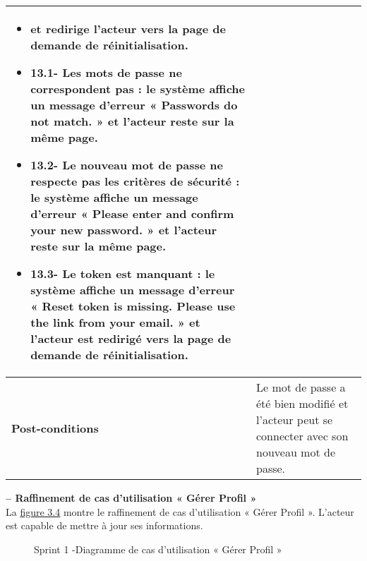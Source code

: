 \begin{longtable}{|>{\arraybackslash}p{4.2cm}|>{\arraybackslash}p{12.5cm}|}
\begin{itemize}[label=]
    \item et redirige l'acteur vers la page de demande de réinitialisation.
    \item{13.1-} Les mots de passe ne correspondent pas : le système affiche un message d'erreur « Passwords do not match. » et l'acteur reste sur la même page.
      \item{13.2-} Le nouveau mot de passe ne respecte pas les critères de sécurité : le système affiche un message d'erreur « Please enter and confirm your new password. » et l'acteur reste sur la même page.
      \item{13.3-} Le token est manquant : le système affiche un message d'erreur « Reset token is missing. Please use the link from your email. » et l'acteur est redirigé vers la page de demande de réinitialisation.

\end{itemize} \\
\hline
\textbf{Post-conditions } & Le mot de passe a été bien modifié et l'acteur peut se connecter avec son nouveau mot de passe.

\end{longtable}



\textbf{ – Raffinement de cas d'utilisation « Gérer Profil »}\\
La \hyperref[fig:3.4]{figure 3.4} montre le raffinement de cas d'utilisation « Gérer Profil ». L'acteur est capable de mettre à jour ses informations.
\begin{figure}[H]
\centering
{}
\caption{ Sprint 1 -Diagramme de cas d'utilisation « Gérer Profil »
}
\label{fig:3.4}
\end{figure}

